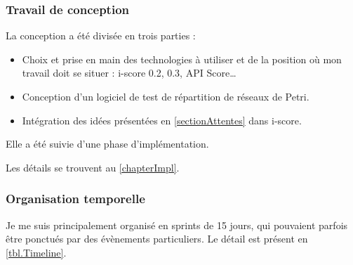 \subsubsection{Travail de conception}
La conception a été divisée en trois parties : 
\begin{itemize}
	\item Choix et prise en main des technologies à utiliser et de la position où mon travail doit se situer : i-score 0.2, 0.3, API Score\dots
	\item Conception d'un logiciel de test de répartition de réseaux de Petri.
	\item Intégration des idées présentées en \cref{sectionAttentes} dans i-score.
\end{itemize}

Elle a été suivie d'une phase d'implémentation.

Les détails se trouvent au \cref{chapterImpl}.

\subsubsection{Organisation temporelle}
Je me suis principalement organisé en sprints de 15 jours, qui pouvaient parfois être ponctués par des évènements particuliers. Le détail est présent en \cref{tbl.Timeline}.

